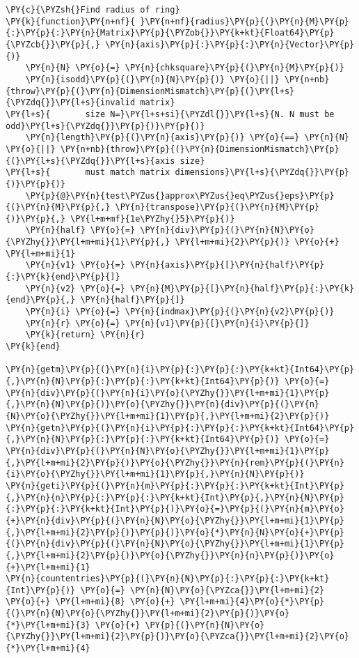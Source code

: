 \begin{Verbatim}[commandchars=\\\{\}]
\PY{c}{\PYZsh{}Find radius of ring}
\PY{k}{function}\PY{n+nf}{ }\PY{n+nf}{radius}\PY{p}{(}\PY{n}{M}\PY{p}{:}\PY{p}{:}\PY{n}{Matrix}\PY{p}{\PYZob{}}\PY{k+kt}{Float64}\PY{p}{\PYZcb{}}\PY{p}{,} \PY{n}{axis}\PY{p}{:}\PY{p}{:}\PY{n}{Vector}\PY{p}{)}
    \PY{n}{N} \PY{o}{=} \PY{n}{chksquare}\PY{p}{(}\PY{n}{M}\PY{p}{)}
    \PY{n}{isodd}\PY{p}{(}\PY{n}{N}\PY{p}{)} \PY{o}{||} \PY{n+nb}{throw}\PY{p}{(}\PY{n}{DimensionMismatch}\PY{p}{(}\PY{l+s}{\PYZdq{}}\PY{l+s}{invalid matrix}
\PY{l+s}{       size N=}\PY{l+s+si}{\PYZdl{}}\PY{l+s}{N. N must be odd}\PY{l+s}{\PYZdq{}}\PY{p}{)}\PY{p}{)}
    \PY{n}{length}\PY{p}{(}\PY{n}{axis}\PY{p}{)} \PY{o}{==} \PY{n}{N} \PY{o}{||} \PY{n+nb}{throw}\PY{p}{(}\PY{n}{DimensionMismatch}\PY{p}{(}\PY{l+s}{\PYZdq{}}\PY{l+s}{axis size}
\PY{l+s}{       must match matrix dimensions}\PY{l+s}{\PYZdq{}}\PY{p}{)}\PY{p}{)}
    \PY{p}{@}\PY{n}{test\PYZus{}approx\PYZus{}eq\PYZus{}eps}\PY{p}{(}\PY{n}{M}\PY{p}{,} \PY{n}{transpose}\PY{p}{(}\PY{n}{M}\PY{p}{)}\PY{p}{,} \PY{l+m+mf}{1e\PYZhy{}5}\PY{p}{)}
    \PY{n}{half} \PY{o}{=} \PY{n}{div}\PY{p}{(}\PY{n}{N}\PY{o}{\PYZhy{}}\PY{l+m+mi}{1}\PY{p}{,} \PY{l+m+mi}{2}\PY{p}{)} \PY{o}{+} \PY{l+m+mi}{1}
    \PY{n}{v1} \PY{o}{=} \PY{n}{axis}\PY{p}{[}\PY{n}{half}\PY{p}{:}\PY{k}{end}\PY{p}{]}
    \PY{n}{v2} \PY{o}{=} \PY{n}{M}\PY{p}{[}\PY{n}{half}\PY{p}{:}\PY{k}{end}\PY{p}{,} \PY{n}{half}\PY{p}{]}
    \PY{n}{i} \PY{o}{=} \PY{n}{indmax}\PY{p}{(}\PY{n}{v2}\PY{p}{)}
    \PY{n}{r} \PY{o}{=} \PY{n}{v1}\PY{p}{[}\PY{n}{i}\PY{p}{]}
    \PY{k}{return} \PY{n}{r}
\PY{k}{end}

\PY{n}{getm}\PY{p}{(}\PY{n}{i}\PY{p}{:}\PY{p}{:}\PY{k+kt}{Int64}\PY{p}{,}\PY{n}{N}\PY{p}{:}\PY{p}{:}\PY{k+kt}{Int64}\PY{p}{)} \PY{o}{=} \PY{n}{div}\PY{p}{(}\PY{n}{i}\PY{o}{\PYZhy{}}\PY{l+m+mi}{1}\PY{p}{,}\PY{n}{N}\PY{p}{)}\PY{o}{\PYZhy{}}\PY{n}{div}\PY{p}{(}\PY{n}{N}\PY{o}{\PYZhy{}}\PY{l+m+mi}{1}\PY{p}{,}\PY{l+m+mi}{2}\PY{p}{)}
\PY{n}{getn}\PY{p}{(}\PY{n}{i}\PY{p}{:}\PY{p}{:}\PY{k+kt}{Int64}\PY{p}{,}\PY{n}{N}\PY{p}{:}\PY{p}{:}\PY{k+kt}{Int64}\PY{p}{)} \PY{o}{=} \PY{n}{div}\PY{p}{(}\PY{n}{N}\PY{o}{\PYZhy{}}\PY{l+m+mi}{1}\PY{p}{,}\PY{l+m+mi}{2}\PY{p}{)}\PY{o}{\PYZhy{}}\PY{n}{rem}\PY{p}{(}\PY{n}{i}\PY{o}{\PYZhy{}}\PY{l+m+mi}{1}\PY{p}{,}\PY{n}{N}\PY{p}{)}
\PY{n}{geti}\PY{p}{(}\PY{n}{m}\PY{p}{:}\PY{p}{:}\PY{k+kt}{Int}\PY{p}{,}\PY{n}{n}\PY{p}{:}\PY{p}{:}\PY{k+kt}{Int}\PY{p}{,}\PY{n}{N}\PY{p}{:}\PY{p}{:}\PY{k+kt}{Int}\PY{p}{)}\PY{o}{=}\PY{p}{(}\PY{n}{m}\PY{o}{+}\PY{n}{div}\PY{p}{(}\PY{n}{N}\PY{o}{\PYZhy{}}\PY{l+m+mi}{1}\PY{p}{,}\PY{l+m+mi}{2}\PY{p}{)}\PY{p}{)}\PY{o}{*}\PY{n}{N}\PY{o}{+}\PY{p}{(}\PY{n}{div}\PY{p}{(}\PY{n}{N}\PY{o}{\PYZhy{}}\PY{l+m+mi}{1}\PY{p}{,}\PY{l+m+mi}{2}\PY{p}{)}\PY{o}{\PYZhy{}}\PY{n}{n}\PY{p}{)}\PY{o}{+}\PY{l+m+mi}{1}
\PY{n}{countentries}\PY{p}{(}\PY{n}{N}\PY{p}{:}\PY{p}{:}\PY{k+kt}{Int}\PY{p}{)} \PY{o}{=} \PY{n}{N}\PY{o}{\PYZca{}}\PY{l+m+mi}{2} \PY{o}{+} \PY{l+m+mi}{8} \PY{o}{+} \PY{l+m+mi}{4}\PY{o}{*}\PY{p}{(}\PY{n}{N}\PY{o}{\PYZhy{}}\PY{l+m+mi}{2}\PY{p}{)}\PY{o}{*}\PY{l+m+mi}{3} \PY{o}{+} \PY{p}{(}\PY{n}{N}\PY{o}{\PYZhy{}}\PY{l+m+mi}{2}\PY{p}{)}\PY{o}{\PYZca{}}\PY{l+m+mi}{2}\PY{o}{*}\PY{l+m+mi}{4}


\end{Verbatim}
